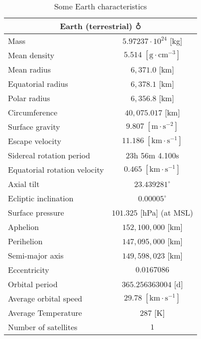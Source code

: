 	\begin{table}[H]
		\centering
		\begin{tabular}{|l|c|}
		\hline
		\multicolumn{2}{|c|}{\cellcolor[HTML]{9B9B9B}\textbf{Earth (terrestrial) $\earth$}} \\ \hline
		Mass & $5.97237\cdot 10^{24}$ {[}kg{]} \\ \hline	
		Mean density & $5.514\;[\text{g}\cdot \text{cm}^{-3}]$ \\ \hline
		Mean radius & $6,371.0$ {[}km{]} \\ \hline
		Equatorial radius & $6,378.1$  {[}km{]} \\ \hline
		Polar radius & $6,356.8$ {[}km{]} \\ \hline
		Circumference & $40,075.017$ {[}km{]} \\ \hline
		Surface gravity & $9.807\; [\text{m}\cdot \text{s}^{-2}]$ \\ \hline
		Escape velocity & $11.186\;[\text{km}\cdot\text{s}^{-1}]$ \\ \hline
		Sidereal rotation period & 23h 56m 4.100s \\ \hline
		Equatorial rotation velocity & $0.465\;[\text{km}\cdot\text{s}^{-1}]$ \\ \hline
		Axial tilt & $23.439281^\circ$ \\ \hline
		Ecliptic inclination & $0.00005^\circ$ \\ \hline
		Surface pressure & $101.325$ {[}hPa{]} (at MSL) \\ \hline
		Aphelion & $152,100,000$ {[}km{]} \\ \hline
		Perihelion & $147,095,000$ {[}km{]} \\ \hline
		Semi-major axis & $149,598,023$ {[}km{]} \\ \hline
		Eccentricity & $0.0167086$ \\ \hline
		Orbital period & $365.256363004$ {[}d{]} \\ \hline
		Average orbital speed & $29.78\;[\text{km}\cdot\text{s}^{-1}]$ \\ \hline
		Average Temperature & $287$ {[}K{]} \\ \hline
		Number of satellites & $1$ \\ \hline
		\end{tabular}
		\caption{Some Earth characteristics}
	\end{table}
	
